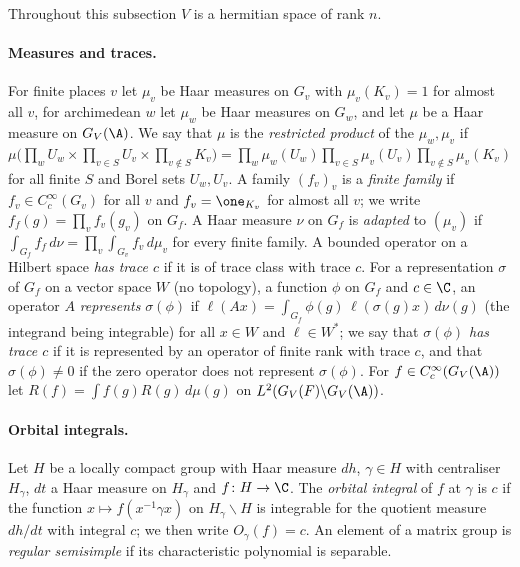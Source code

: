 Throughout this subsection $V$ is a hermitian space of rank $n$.

\paragraph{Measures and traces.} For finite places $v$ let $\mu_v$ be Haar measures on $G_v$ with $\mu_v(K_v)=1$ for
almost all $v$, for archimedean $w$ let $\mu_w$ be Haar measures on $G_w$, and let $\mu$ be a Haar measure on
$G_V(\A)$. We say that $\mu$ is the \emph{restricted product} of the $\mu_w,\mu_v$ if
$\mu\bigl(\prod_wU_w\times\prod_{v\in S}U_v\times\prod_{v\notin S}K_v\bigr)=\prod_w\mu_w(U_w)\prod_{v\in S}\mu_v(U_v)
\prod_{v\notin S}\mu_v(K_v)$ for all finite $S$ and Borel sets $U_w,U_v$. A family $(f_v)_v$ is a \emph{finite family} if
$f_v\in C_c^\infty(G_v)$ for all $v$ and $f_v=\one_{K_v}$ for almost all $v$; we write $f_f(g)=\prod_vf_v(g_v)$ on $G_f$.
A Haar measure $\nu$ on $G_f$ is \emph{adapted} to $(\mu_v)$ if $\int_{G_f}f_f\,d\nu=\prod_v\int_{G_v}f_v\,d\mu_v$ for
every finite family. A bounded operator on a Hilbert space \emph{has trace $c$} if it is of trace class with trace $c$.
For a representation $\sigma$ of $G_f$ on a vector space $W$ (no topology), a function $\phi$ on $G_f$ and $c\in\C$, an
operator $A$ \emph{represents} $\sigma(\phi)$ if $\ell(Ax)=\int_{G_f}\phi(g)\,\ell(\sigma(g)x)\,d\nu(g)$ (the integrand
being integrable) for all $x\in W$ and $\ell\in W^*$; we say that \emph{$\sigma(\phi)$ has trace $c$} if it is represented
by an operator of finite rank with trace $c$, and that $\sigma(\phi)\ne0$ if the zero operator does not represent
$\sigma(\phi)$. For $f\in C_c^\infty(G_V(\A))$ let $R(f)=\int f(g)R(g)\,d\mu(g)$ on $L^2(G_V(F)\backslash G_V(\A))$.

\paragraph{Orbital integrals.} Let $H$ be a locally compact group with Haar measure $dh$, $\gamma\in H$ with centraliser
$H_\gamma$, $dt$ a Haar measure on $H_\gamma$ and $f\colon H\to\C$. The \emph{orbital integral} of $f$ at $\gamma$ is
$c$ if the function $x\mapsto f(x^{-1}\gamma x)$ on $H_\gamma\backslash H$ is integrable for the quotient measure
$dh/dt$ with integral $c$; we then write $O_\gamma(f)=c$. An element of a matrix group is \emph{regular semisimple} if
its characteristic polynomial is separable.

